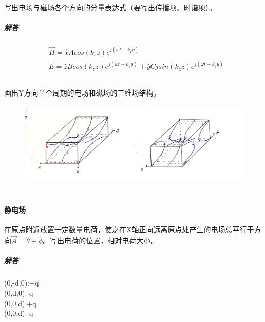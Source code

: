 \documentclass[UTF8]{ctexart}
\begin{document}
\paragraph{}
写出电场与磁场各个方向的分量表达式（要写出传播项、时谐项）。
\subparagraph{解答}
\begin{equation*}
\begin{aligned}
&\vec{H}=\hat xAcos(k_zz)e^{j(\omega t-k_yy)}\\
&\vec{E}=\hat zBcos(k_zz)e^{j(\omega t-k_yy)} +\hat yCjsin(k_zz)e^{j(\omega t-k_yy)}
\end{aligned}
\end{equation*}
\subsection{}
\paragraph{}
画出Y方向半个周期的电场和磁场的三维场结构。
\begin{figure}[htbp]
\centering
\includegraphics[width=14cm,height=4cm]{2019-2.jpg}
\end{figure}
\section{}
\subsection{}
\paragraph{静电场}
在原点附近放置一定数量电荷，使之在X轴正向远离原点处产生的电场总平行于方向$\vec A=\hat\theta+\hat\phi$。写出电荷的位置，相对电荷大小。
\subparagraph{解答}
(0,-d,0):+q\\
(0,d,0):-q\\
(0,0,d):+q\\
(0,0,d):-q\\
\subsection{}
\end{document}
